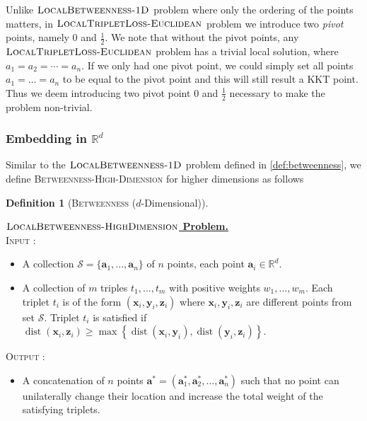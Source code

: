 \documentclass{article}
\theoremstyle{definition}  %
\theoremstyle{plain}
\newtheorem{definition}{Definition}
\numberwithin{observation}{section}
\numberwithin{claim}{section}
\numberwithin{fact}{section}
\numberwithin{lemma}{section}
\numberwithin{proposition}{section}
\numberwithin{theorem}{section}
\numberwithin{corollary}{section}
\numberwithin{definition}{section}
\def\va{{\bm{a}}}
\def\vx{{\bm{x}}}
\def\vy{{\bm{y}}}
\def\vz{{\bm{z}}}
\newcommand{\calS}{\ensuremath{\mathcal{S}}}
\DeclareMathOperator{\dist}{dist}
\newenvironment{nproblem}[1][\unskip]{%
  \medskip
  \begin{mdframed}
  \noindent
  \textbf{\underline{$#1$ Problem.}} \\
  \noindent
}{%
  \end{mdframed}
  \medskip %
}
\newcommand{\betweeness}{\textsc{LocalBetweenness-1D}}
\newcommand{\betweenessHighdim}{\textsc{LocalBetweenness-HighDimension}}
\newcommand{\Contrastive}{\textsc{LocalTripletLoss-Euclidean}}
\theoremstyle{plain}
\begin{document}
Unlike $\betweeness$ problem where only the ordering of the points matters, in $\Contrastive$ problem we introduce two \textit{pivot} points, namely $0$ and $\frac{1}{2}$. We note that without the pivot points, any $\Contrastive$ problem has a trivial local solution, where $a_1 = a_2 = \cdots = a_n.$ If we only had one pivot point, we could simply set all points $a_1 = \dots = a_n$ to be equal to the pivot point and this will still result a KKT point. Thus we deem introducing two pivot point $0$ and $\frac{1}{2}$ necessary to make the problem non-trivial.



\subsubsection{Embedding in \texorpdfstring{\(\mathbb{R}^d\)}{Rd}}
Similar to the $\betweeness$ problem defined in \cref{def:betweenness}, we define \textsc{Betweenness-High-Dimension} for higher dimensions as follows

\begin{definition}[\textsc{Betweenness} ($d$-Dimensional)]
\end{definition}

\begin{nproblem}[\betweenessHighdim] \label{def:betweenness-high-dim}
 \textsc{Input :}  \begin{itemize}
   \vspace{-0.1in}
   \item A collection $\calS = \{\va_1,...,\va_n\} $ of $n$ points, each point $\va_i \in \mathbb{R}^d.$
   \item A collection of $m$ triples $t_1,...,t_m$ with positive weights $w_1,...,w_m$. Each triplet $t_i$ is of the form $(\vx_i, \vy_i, \vz_i)$ where $\vx_i, \vy_i, \vz_i$ are different points from set $\calS$. Triplet $t_i$ is satisfied if $\dist(\vx_i, \vz_i) \geq \max\left\{\dist(\vx_i, \vy_i), \dist(\vy_i, \vz_i)\right\}.$
   
\end{itemize}
  \vspace{-0.1in}
  \noindent \textsc{Output :} \begin{itemize}[label = ]
      \vspace{-0.1in}
      \item A concatenation of $n$ points $\va^* = (\va_1^*, \va_2^*, \dots, \va_n^*)$ such that no point can unilaterally change their location and increase the total weight of the satisfying triplets. 
  \end{itemize}
\end{nproblem}
\end{document}
